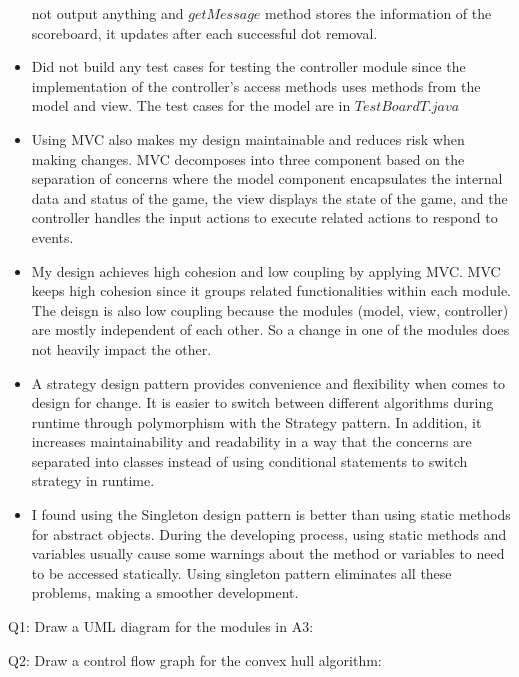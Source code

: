 \documentclass[12pt]{article}
\begin{document}
\begin{itemize}
        not output anything and $getMessage$ method stores the information of the scoreboard, it updates after each successful dot removal.
  \item Did not build any test cases for testing the controller module since the implementation of the controller's access methods uses 
        methods from the model and view. The test cases for the model are in $TestBoardT.java$
  \item Using MVC also makes my design maintainable and reduces risk when making changes. MVC decomposes into three 
        component based on the separation of concerns where the model component encapsulates the internal 
        data and status of the game, the view displays the state of the game, and the controller handles
        the input actions to execute related actions to respond to events.
  \item My design achieves high cohesion and low coupling by applying MVC. MVC keeps high cohesion since
        it groups related functionalities within each module. The deisgn is also low coupling because
        the modules (model, view, controller) are mostly independent of each other. So a change in one of the
        modules does not heavily impact the other.
  \item A strategy design pattern provides convenience and flexibility when comes to design for change. It is easier to switch
        between different algorithms during runtime through polymorphism with the Strategy pattern. In addition, it increases
        maintainability and readability in a way that the concerns are separated into classes instead of using
        conditional statements to switch strategy in runtime.
  \item I found using the Singleton design pattern is better than using static methods for abstract objects. During the developing process, using 
        static methods and variables usually cause some warnings about the method or variables to need to be accessed statically. Using singleton
        pattern eliminates all these problems, making a smoother development.
  
\end{itemize}

\newpage

\noindent Q1: Draw a UML diagram for the modules in A3:

\noindent Q2: Draw a control flow graph for the convex hull algorithm:


\end{document}
